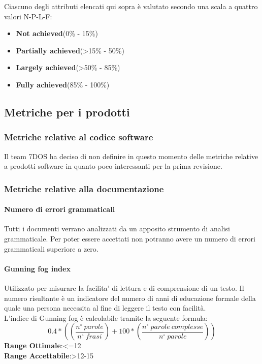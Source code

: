 Ciascuno degli attributi elencati qui sopra è valutato secondo una scala a quattro valori N-P-L-F:
\begin{itemize}
	\item{\textbf{Not achieved}}(0\% - 15\%)
	\item{\textbf{Partially achieved}}(>15\% - 50\%)
	\item{\textbf{Largely achieved}}(>50\% - 85\%)
	\item{\textbf{Fully achieved}}(85\% - 100\%)
\end{itemize}
\subsection{Metriche per i prodotti}
\subsubsection{Metriche relative al codice software}
Il team 7DOS ha deciso di non definire in questo momento delle metriche relative a prodotti software in quanto poco interessanti per la prima revisione.
\subsubsection{Metriche relative alla documentazione}
\paragraph{Numero di errori grammaticali}
\begin{flushleft}
Tutti i documenti verrano analizzati da un apposito strumento di analisi grammaticale. Per poter essere accettati non potranno avere un numero di errori grammaticali superiore a zero.
\end{flushleft}

\paragraph{Gunning fog index}
\begin{flushleft}
Utilizzato per misurare la facilita' di lettura e di comprensione di un testo. Il numero risultante è un indicatore del numero di anni di educazione formale della quale una persona necessita al fine di leggere il testo con facilità. \\
L'indice di Gunning fog è calcolabile tramite la seguente formula:
$$
	0.4*((\frac{n^{\circ}\:parole}{n^{\circ}\:frasi})+100*(\frac{n^{\circ}\:parole\:complesse}{n^{\circ}\:parole}))
$$
\textbf{Range Ottimale}:<=12 \\
\textbf{Range Accettabile}:>12-15
\end{flushleft}
